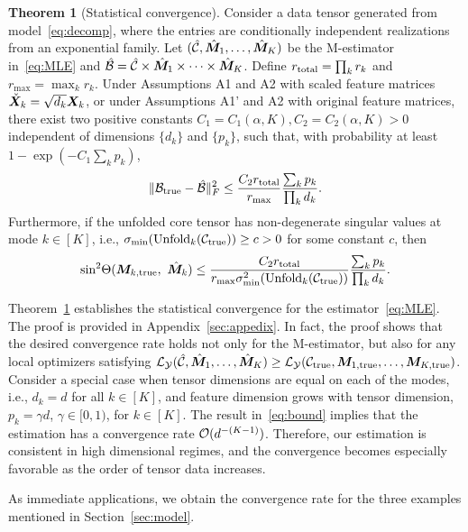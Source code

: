 \documentclass[12pt]{article}
\theoremstyle{definition}
\newtheorem{thm}{Theorem}[section]
\theoremstyle{definition}
\begin{document}
 
\begin{thm}[Statistical convergence]\label{thm:main}
Consider a data tensor generated from model~\eqref{eq:decomp}, where the entries are conditionally independent realizations from an exponential family. Let $(\hat {\mathcal{C}}, \hat {\bm M}_1,\ldots,\hat {\bm M}_K)$ be the M-estimator in~\eqref{eq:MLE} and $\hat {\mathcal{B}}=\hat {\mathcal{C}}\times \hat {\bm M}_1\times\cdots \times \hat {\bm M}_K$. Define $r_\textup{total}=\prod_k r_k$ and $r_{\max}=\max_k r_k$. Under Assumptions A1 and A2 with scaled feature matrices $\check {\bm X}_k= \sqrt{d_k}\bm X_k$, or under Assumptions A1' and A2 with original feature matrices, there exist two positive constants $C_1=C_1(\alpha,K), C_2=C_2(\alpha, K)>0$ independent of dimensions $\{d_k\}$ and $\{p_k\}$, such that, with probability at least $1-\exp(-C_1\sum_k p_k)$, 
\begin{equation}\label{eq:bound}
    \lVert\mathcal{B}_{\textup{true}}- \hat {\mathcal{B}}\rVert_F^2\leq \frac{ C_{2} r_{\textup{total}}}{r_{\max}}\frac{\sum_k p_k}{\prod_k d_k}.
\end{equation}
Furthermore, if the unfolded core tensor has non-degenerate singular values at mode $k\in[K]$, i.e., $\sigma_{\min}(\textup{Unfold}_k(\mathcal{C}_\textup{true})) \geq c>0$ for some constant $c$, then
\begin{equation}\label{eq:sinebound}
\textup{sin}^2 \Theta(\bm M_{k,\textup{true}},\ \hat {\bm M}_k) \leq  \frac{ C_{2}r_{\textup{total}}}{ r_{\max}\sigma^2_{\min}(\textup{Unfold}_k(\mathcal{C}_\textup{true}))}\frac{\sum_k p_k}{\prod_k d_k}.
\end{equation}
\end{thm}

Theorem~\ref{thm:main} establishes the statistical convergence for the estimator~\eqref{eq:MLE}. The proof is provided in Appendix~\ref{sec:appedix}. In fact, the proof shows that the desired convergence rate holds not only for the M-estimator, but also for any local optimizers satisfying $\mathcal{L}_{\mathcal{Y}}(\hat {\mathcal{C}}, \hat {\bm M}_1,\ldots,\hat {\bm M}_K) \geq \mathcal{L}_{\mathcal{Y}}(\mathcal{C}_{\textup{true}},  \bm M_{1,\textup{true}},\ldots,\bm M_{K,\textup{true}})$. Consider a special case when tensor dimensions are equal on each of the modes, i.e., $d_k=d$ for all $k\in[K]$, and feature dimension grows with tensor dimension, $p_k=\gamma d$, $\gamma\in [0,1)$, for $k\in[K]$. The result in~\eqref{eq:bound} implies that the estimation has a convergence rate $\mathcal{O}(d^{-(K-1)})$. Therefore, our estimation is consistent in high dimensional regimes, and the convergence becomes especially favorable as the order of tensor data increases. 

As immediate applications, we obtain the convergence rate for the three examples mentioned in Section~\ref{sec:model}.
\end{document}
